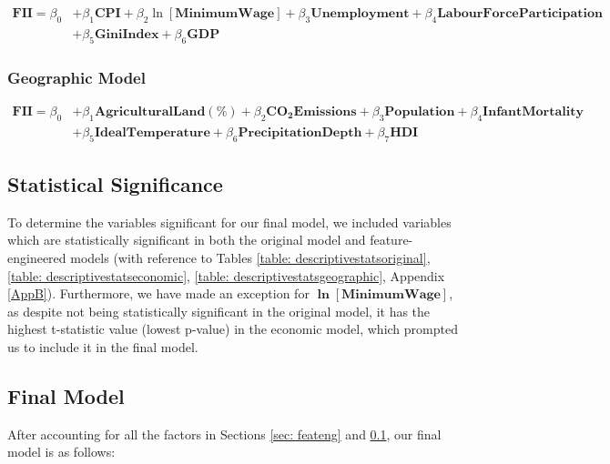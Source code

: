 \documentclass{article}
\begin{document}
\begin{equation}\label{economicmodel}
    \begin{aligned}
        \mathbf{FII} = \beta_0 &+ \beta_1\mathbf{CPI} + \beta_2\ln{[\mathbf{MinimumWage}]} + \beta_3\mathbf{Unemployment} + \beta_4\mathbf{LabourForceParticipation} \\ &+ \beta_5\mathbf{GiniIndex} + \beta_6\mathbf{GDP}
    \end{aligned}
\end{equation}

\subsubsection{Geographic Model}

\begin{equation}\label{geographicmodel}
    \begin{aligned}
        \mathbf{FII} = \beta_0 &+ \beta_1\mathbf{AgriculturalLand(\%)} + \beta_2\mathbf{CO_2Emissions} + \beta_3\mathbf{Population} + \beta_4\mathbf{InfantMortality} \\ &+ \beta_5\mathbf{IdealTemperature} + \beta_6\mathbf{PrecipitationDepth} + \beta_7\mathbf{HDI}
    \end{aligned}
\end{equation}

\subsection{Statistical Significance}\label{sec: statsig}
To determine the variables significant for our final model, we included variables which are statistically significant in both the original model and feature-engineered models (with reference to Tables \ref{table: descriptivestatsoriginal}, \ref{table: descriptivestatseconomic}, \ref{table: descriptivestatsgeographic}, Appendix \ref{AppB}). Furthermore, we have made an exception for \textbf{$\bm{\ln{[\text{MinimumWage}]}}$}, as despite not being statistically significant in the original model, it has the highest t-statistic value (lowest p-value) in the economic model, which prompted us to include it in the final model. 

\subsection{Final Model}\label{sec:FinalModel}
After accounting for all the factors in Sections \ref{sec: feateng}
 and \ref{sec: statsig}, our final model is as follows:
 
\end{document}
